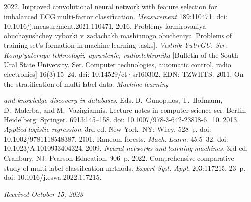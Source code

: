 \begin{multicols}{2}
{{\begin{thebibliography}{99}
 2022. Improved 
convolutional neural network with feature selection for imbalanced ECG  
multi-factor classification. \textit{Measurement} 189:110471. doi: 
10.1016/j.\linebreak measurement.2021.110471.
 2016. Problemy formirovaniya 
obuchayushchey vyborki v~zadachakh mashinnogo obucheniya [Problems of 
training set's formation in machine learning tasks]. \textit{Vestnik YuUrGU. Ser. 
Komp'yuternye tekhnologii, upravlenie, radioelektronika} [Bulletin of the South 
Ural State University. Ser. Computer technologies, automatic control, radio 
electronics] 16(3):15--24. doi: 10.14529/ct·sr160302. EDN: \mbox{TZWHTS}.
 2011. On the stratification of 
multi-label data. \textit{Machine learning}\linebreak\vspace*{-12pt}

\pagebreak

\noindent
\textit{and knowledge discovery in databases}. 
Eds. D.~Gunopulos, T.~Hofmann, D.~Malerba, and M.~Vazirgiannis. Lecture 
notes in computer science ser. Berlin, Heidelberg: Springer. 6913:145--158. doi: 
10.1007/978-3-642-23808-6\_10.
 2013. \textit{Applied 
logistic regression}. 3rd ed. New York, NY: Wiley. 528~p. doi: 
10.1002/9781118548387.
 2001. Random forests. \textit{Mach. Learn.} 45:5--32. doi: 
10.1023/A:1010933404324.
 2009. \textit{Neural networks and learning machines}. 3rd ed. 
Cranbury, NJ: Pearson Education. 906~p.
 2022.  
Comprehensive comparative study of multi-label classification methods. 
\textit{Expert Syst. Appl.} 203:117215. 23~p. doi: 10.1016/j.eswa.2022.117215.

\end{thebibliography}

 }
 }

\end{multicols}

\vspace*{-6pt}

\hfill{\small\textit{Received October 15, 2023}} 


